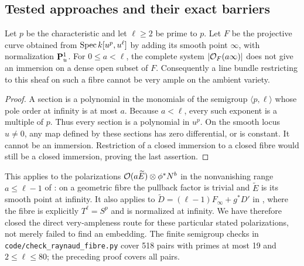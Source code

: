 \subsection{Tested approaches and their exact barriers}
\begin{proposition}\label{a:fibre}
Let $p$ be the characteristic and let $\ell\geq2$ be prime to $p$.
Let $F$ be the projective curve obtained from
$\operatorname{Spec} k[u^p,u^\ell]$ by adding its smooth point $\infty$, with
normalization $\mathbf P^1_u$.  For $0\leq a<\ell$, the complete system
$|\mathcal O_F(a\infty)|$ does not give an immersion on a dense open subset
of $F$.  Consequently a line bundle restricting to this sheaf on such
a fibre cannot be very ample on the ambient variety.
\end{proposition}
\begin{proof}
A section is a polynomial in the monomials of the semigroup
$\langle p,\ell\rangle$ whose pole order at infinity is at most $a$.
Because $a<\ell$, every such exponent is a multiple of $p$.
Thus every section is a polynomial in $u^p$.  On the smooth locus
$u\ne0$, any map defined by these sections has zero differential, or
is constant.  It cannot be an immersion.  Restriction of a closed
immersion to a closed fibre would still be a closed immersion, proving
the last assertion.
\end{proof}
This applies to the polarizations $\mathcal O(a\widetilde E)\otimes\phi^*N^b$
in the nonvanishing range $a\leq\ell-1$ of
\cite[Theorem 3.7]{Zheng2015}: on a geometric fibre the pullback factor
is trivial and $\widetilde E$ is its smooth point at infinity.  It also
applies to $\widetilde D=(\ell-1)F_\infty+g^*D'$ in
\cite[Definition 2.1 and Proposition 2.3, pp.~7--8]{Mukai2013revised},
where the fibre is explicitly $T^\ell=S^p$ and is normalized at infinity.
We have therefore closed the direct very-ampleness route for these
particular stated polarizations, not merely failed to find an embedding.
The finite semigroup checks in \texttt{code/check\_raynaud\_fibre.py}
cover 518 pairs with primes at most 19 and $2\leq\ell\leq80$;
the preceding proof covers all pairs.

